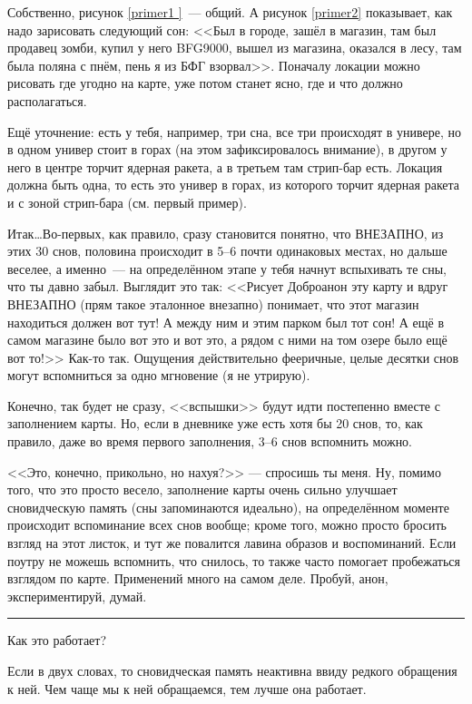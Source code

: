 \documentclass[a5paper,12pt,twoside]{memoir}
\begin{document}
Собственно, рисунок \ref{primer1 }~--- общий. А рисунок \ref{primer2} показывает, как надо зарисовать следующий сон: <<Был в городе, зашёл в магазин, там был продавец зомби, купил у него BFG9000, вышел из магазина, оказался в лесу, там была поляна с пнём, пень я из БФГ взорвал>>. Поначалу локации можно рисовать где угодно на карте, уже потом станет ясно, где и что должно располагаться.


Ещё уточнение: есть у тебя, например, три сна, все три происходят в универе, но в одном универ стоит в горах (на этом зафиксировалось внимание), в другом у него в центре торчит ядерная ракета, а в третьем там стрип-бар есть. Локация должна быть одна, то есть это универ в горах, из которого торчит ядерная ракета и с зоной стрип-бара (см. первый пример). 

\afterpage{\clearpage}

Итак\ldots Во-первых, как правило, сразу становится понятно, что ВНЕЗАПНО, из этих 30 снов, половина происходит в 5--6 почти одинаковых местах, но дальше веселее, а именно~--- на определённом этапе у тебя начнут вспыхивать те сны, что ты давно забыл. Выглядит это так: <<Рисует Доброанон эту карту и вдруг ВНЕЗАПНО (прям такое эталонное внезапно) понимает, что этот магазин находиться должен вот тут! А между ним и этим парком был тот сон! А ещё в самом магазине было вот это и вот это, а рядом с ними на том озере было ещё вот то!>> Как-то так. Ощущения действительно фееричные, целые десятки снов могут вспомниться за одно мгновение (я не утрирую).

Конечно, так будет не сразу, <<вспышки>> будут идти постепенно вместе с заполнением карты. Но, если в дневнике уже есть хотя бы 20 снов, то, как правило, даже во время первого заполнения, 3--6 снов вспомнить можно. 

<<Это, конечно, прикольно, но нахуя?>> — спросишь ты меня. Ну, помимо того, что это просто весело, заполнение карты очень сильно улучшает сновидческую память (сны запоминаются идеально), на определённом моменте происходит вспоминание всех снов вообще; кроме того, можно просто бросить взгляд на этот листок, и тут же повалится лавина образов и воспоминаний. Если поутру не можешь вспомнить, что снилось, то также часто помогает пробежаться взглядом по карте. Применений много на самом деле. Пробуй, анон, экспериментируй, думай.

\medskip

\fancybreak{* * *}

Как это работает?

Если в двух словах, то сновидческая память неактивна ввиду редкого обращения к ней. Чем чаще мы к ней обращаемся, тем лучше она работает.
\end{document}
